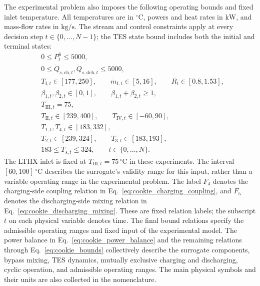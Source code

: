 \documentclass[12pt]{article}
\begin{document}
\endgroup
The experimental problem also imposes the following operating bounds and
fixed inlet temperature. All temperatures are in ${}^\circ\mathrm C$, powers
and heat rates in $\mathrm{kW}$, and mass-flow rates in $\mathrm{kg/s}$.
The stream and control constraints apply at every decision step
$t\in\{0,\ldots,N-1\}$; the TES state bound includes both the initial and
terminal states:
\begin{align}
&0 \leq P_t^{\mathrm S} \leq 5000, \\
&0 \leq \dot{Q}_{s,\mathrm{ch},t},\dot{Q}_{s,\mathrm{dch},t} \leq 5000, \\
&T_{\mathrm{I},t} \in [177,250], \qquad
  \dot{m}_{\mathrm{I},t} \in [5,16], \qquad R_t \in [0.8,1.53], \\
&\beta_{1,t},\beta_{2,t} \in [0,1], \qquad
  \beta_{1,t}+\beta_{2,t} \geq 1, \\
&T_{\mathrm{III},t} = 75, \\
&T_{\mathrm{II},t} \in [239,400], \qquad
  T_{\mathrm{IV},t} \in [-60,90], \\
&T_{1,t},T_{4,t} \in [183,332], \\
&T_{2,t} \in [239,324], \qquad T_{3,t} \in [183,193], \\
&183 \leq T_{s,t} \leq 324, \qquad t\in\{0,\ldots,N\}.
\label{eq:cookie_bounds}
\end{align}
The LTHX inlet is fixed at $T_{\mathrm{III},t}=75\,{}^\circ\mathrm C$ in
these experiments. The interval $[60,100]\,{}^\circ\mathrm C$ describes the
surrogate's validity range for this input, rather than a variable operating
range in the experimental problem.
The label $F_4$ denotes the charging-side coupling relation in
Eq.~\eqref{eq:cookie_charging_coupling}, and $F_5$ denotes the
discharging-side mixing relation in Eq.~\eqref{eq:cookie_discharging_mixing}.
These are fixed relation labels; the subscript $t$ on each physical variable
denotes time.
The final bound relations specify the admissible operating ranges
and fixed input of the experimental model. The power balance in
Eq.~\eqref{eq:cookie_power_balance} and the remaining relations through
Eq.~\eqref{eq:cookie_bounds} collectively describe the surrogate components,
bypass mixing, TES dynamics, mutually exclusive charging and discharging,
cyclic operation, and admissible operating ranges. The main physical symbols
and their units are also collected in the nomenclature.

\end{document}

